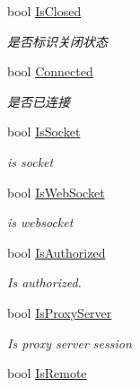 \begin{DoxyCompactItemize}
bool \mbox{\hyperlink{class_t_net_1_1_contract_1_1_game_session_aea76b83afb834569e1789e1350ba1eeb}{Is\+Closed}}
\begin{DoxyCompactList}\small\item\em 是否标识关闭状态 \end{DoxyCompactList}\item 
bool \mbox{\hyperlink{class_t_net_1_1_contract_1_1_game_session_a13ec39939fbc5e4c37c7f8b0f2f9b109}{Connected}}
\begin{DoxyCompactList}\small\item\em 是否已连接 \end{DoxyCompactList}\item 
bool \mbox{\hyperlink{class_t_net_1_1_contract_1_1_game_session_a0c7336e0097b1ffef7a9b5dac9e62d3b}{Is\+Socket}}
\begin{DoxyCompactList}\small\item\em is socket \end{DoxyCompactList}\item 
bool \mbox{\hyperlink{class_t_net_1_1_contract_1_1_game_session_af097b017eda9fad5d725f6de9ab2fb48}{Is\+Web\+Socket}}
\begin{DoxyCompactList}\small\item\em is websocket \end{DoxyCompactList}\item 
bool \mbox{\hyperlink{class_t_net_1_1_contract_1_1_game_session_a55b26d78f5e34afba751751ead401581}{Is\+Authorized}}
\begin{DoxyCompactList}\small\item\em Is authorized. \end{DoxyCompactList}\item 
bool \mbox{\hyperlink{class_t_net_1_1_contract_1_1_game_session_af38f3efaf0800ece1df95aa811bcdc71}{Is\+Proxy\+Server}}
\begin{DoxyCompactList}\small\item\em Is proxy server session \end{DoxyCompactList}\item 
bool \mbox{\hyperlink{class_t_net_1_1_contract_1_1_game_session_a8bf7547ea326bfc61d421f745bc789b7}{Is\+Remote}}
\end{DoxyCompactItemize}
